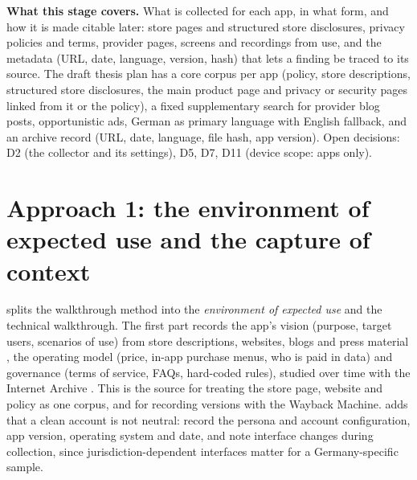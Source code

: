 
\noindent\textbf{What this stage covers.} What is collected for each app, in what form, and how it is made citable later: store pages and structured store disclosures, privacy policies and terms, provider pages, screens and recordings from use, and the metadata (URL, date, language, version, hash) that lets a finding be traced to its source. The draft thesis plan has a core corpus per app (policy, store descriptions, structured store disclosures, the main product page and privacy or security pages linked from it or the policy), a fixed supplementary search for provider blog posts, opportunistic ads, German as primary language with English fallback, and an archive record (URL, date, language, file hash, app version). Open decisions: D2 (the collector and its settings), D5, D7, D11 (device scope: apps only).

\section{Approach 1: the environment of expected use and the capture of context}
 splits the walkthrough method into the \emph{environment of expected use} and the technical walkthrough. The first part records the app's vision (purpose, target users, scenarios of use) from store descriptions, websites, blogs and press material , the operating model (price, in-app purchase menus, who is paid in data)  and governance (terms of service, FAQs, hard-coded rules), studied over time with the Internet Archive . This is the source for treating the store page, website and policy as one corpus, and for recording versions with the Wayback Machine.  adds that a clean account is not neutral: record the persona and account configuration, app version, operating system and date, and note interface changes during collection, since jurisdiction-dependent interfaces matter for a Germany-specific sample.

